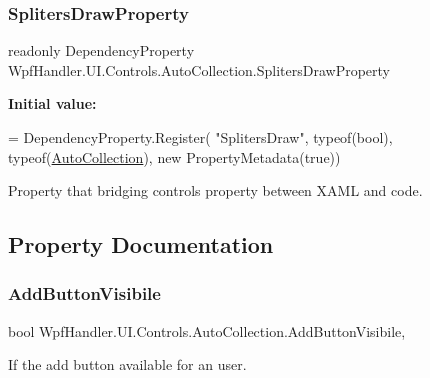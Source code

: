 \subsubsection{\texorpdfstring{Spliters\+Draw\+Property}{SplitersDrawProperty}}
{\footnotesize\ttfamily readonly Dependency\+Property Wpf\+Handler.\+U\+I.\+Controls.\+Auto\+Collection.\+Spliters\+Draw\+Property\hspace{0.3cm}{\ttfamily [static]}}

{\bfseries Initial value\+:}
\begin{DoxyCode}
= DependencyProperty.Register(
          \textcolor{stringliteral}{"SplitersDraw"}, typeof(\textcolor{keywordtype}{bool}), typeof(\mbox{\hyperlink{class_wpf_handler_1_1_u_i_1_1_controls_1_1_auto_collection_a8bc71a7c43dfeca1d6ff113b12088c28}{AutoCollection}}),
          \textcolor{keyword}{new} PropertyMetadata(\textcolor{keyword}{true}))
\end{DoxyCode}


Property that bridging control\textquotesingle{}s property between X\+A\+ML and code. 



\subsection{Property Documentation}
\mbox{\label{class_wpf_handler_1_1_u_i_1_1_controls_1_1_auto_collection_a5b53cdaeabbf4958eb0391475f060771}} 
\subsubsection{\texorpdfstring{Add\+Button\+Visibile}{AddButtonVisibile}}
{\footnotesize\ttfamily bool Wpf\+Handler.\+U\+I.\+Controls.\+Auto\+Collection.\+Add\+Button\+Visibile\hspace{0.3cm}{\ttfamily [get]}, {\ttfamily [set]}}



If the add button available for an user. 

\mbox{\label{class_wpf_handler_1_1_u_i_1_1_controls_1_1_auto_collection_af74226c7fb905acd0a3040ba4b677713}} 
